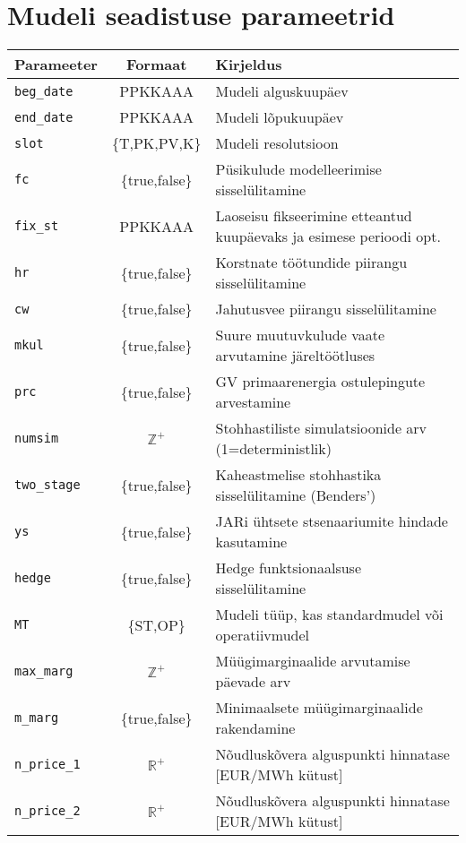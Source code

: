 \documentclass[10pt,a4paper]{article}
\begin{document}
\section{Mudeli seadistuse parameetrid}
\label{sec:seadistus}
\begin{table}
\begin{tabular}{l c l}
Parameeter & Formaat & Kirjeldus \\
\hline
\texttt{beg\_date} &  PPKKAAA       & Mudeli alguskuupäev \\
\texttt{end\_date} &  PPKKAAA       & Mudeli lõpukuupäev  \\
\texttt{slot}      &  \{T,PK,PV,K\} & Mudeli resolutsioon \\
\texttt{fc}        &  \{true,false\}& Püsikulude modelleerimise sisselülitamine \\
\texttt{fix\_st}   &  PPKKAAA       & Laoseisu fikseerimine etteantud kuupäevaks ja esimese perioodi opt.\\
\texttt{hr}        &  \{true,false\}& Korstnate töötundide piirangu sisselülitamine \\
\texttt{cw}        &  \{true,false\}& Jahutusvee piirangu sisselülitamine \\
\texttt{mkul}      &  \{true,false\}& Suure muutuvkulude vaate arvutamine järeltöötluses \\
\texttt{prc}       &  \{true,false\}& GV primaarenergia ostulepingute arvestamine \\
\texttt{numsim}    &  $\mathbb{Z}^+$& Stohhastiliste simulatsioonide arv (1=deterministlik)\\
\texttt{two\_stage}&  \{true,false\}& Kaheastmelise stohhastika sisselülitamine (Benders') \\
\texttt{ys}        &  \{true,false\}& JARi ühtsete stsenaariumite hindade kasutamine\\
\texttt{hedge}     &  \{true,false\}& Hedge funktsionaalsuse sisselülitamine \\
\texttt{MT}        &  \{ST,OP\}     & Mudeli tüüp, kas standardmudel või operatiivmudel  \\ 
\texttt{max\_marg} &  $\mathbb{Z}^+$  & Müügimarginaalide arvutamise päevade arv \\
\texttt{m\_marg}   &  \{true,false\}  & Minimaalsete müügimarginaalide rakendamine \\
\texttt{n\_price\_1}&  $\mathbb{R}^+$  & Nõudluskõvera alguspunkti hinnatase [EUR/MWh kütust]\\
\texttt{n\_price\_2}&  $\mathbb{R}^+$  & Nõudluskõvera alguspunkti hinnatase [EUR/MWh kütust]\\

\end{tabular}
\end{table}
\end{document}
